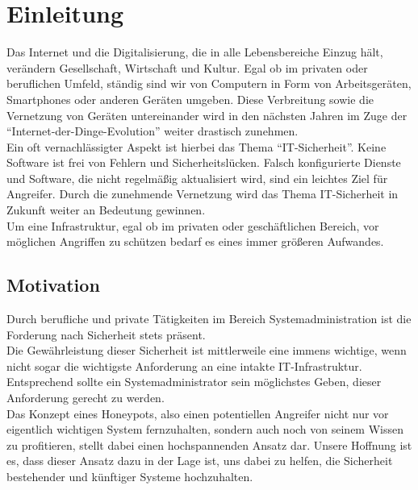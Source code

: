 \chapter{Einleitung}
\label{sec:einleitung}

Das Internet und die Digitalisierung, die in alle Lebensbereiche Einzug hält, verändern Gesellschaft, Wirtschaft und Kultur. Egal ob im privaten oder beruflichen Umfeld, ständig sind wir von Computern in Form von Arbeitsgeräten, Smartphones oder anderen Geräten umgeben. Diese Verbreitung sowie die Vernetzung von Geräten untereinander wird in den nächsten Jahren im Zuge der "`Internet-der-Dinge-Evolution"' weiter drastisch zunehmen.\\


Ein oft vernachlässigter Aspekt ist hierbei das Thema "`IT-Sicherheit"'. Keine Software ist frei von Fehlern und Sicherheitslücken. Falsch konfigurierte Dienste und Software, die nicht regelmäßig aktualisiert wird, sind ein leichtes Ziel für Angreifer. Durch die zunehmende Vernetzung wird das Thema IT-Sicherheit in Zukunft weiter an Bedeutung gewinnen.\\

Um eine Infrastruktur, egal ob im privaten oder geschäftlichen Bereich, vor möglichen Angriffen zu schützen bedarf es eines immer größeren Aufwandes.



\section{Motivation}
\label{subsec:Motivation}

Durch berufliche und private Tätigkeiten im Bereich Systemadministration ist die Forderung nach Sicherheit stets präsent.\\

Die Gewährleistung dieser Sicherheit ist mittlerweile eine immens wichtige, wenn nicht sogar die wichtigste Anforderung an eine intakte IT-Infrastruktur. Entsprechend sollte ein Systemadministrator sein möglichstes Geben, dieser Anforderung gerecht zu werden.\\

Das Konzept eines Honeypots, also einen potentiellen Angreifer nicht nur vor eigentlich wichtigen System fernzuhalten, sondern auch noch von seinem Wissen zu profitieren, stellt dabei einen hochspannenden Ansatz dar. Unsere Hoffnung ist es, dass dieser Ansatz dazu in der Lage ist, uns dabei zu helfen, die Sicherheit bestehender und künftiger Systeme hochzuhalten.

